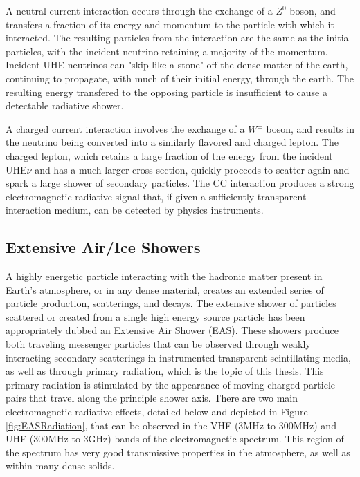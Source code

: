 		A neutral current interaction occurs through the exchange of a $Z^{0}$ boson, and transfers a fraction of its energy and momentum to the particle with which it interacted.  The resulting particles from the interaction are the same as the initial particles, with the incident neutrino retaining a majority of the momentum.  Incident UHE neutrinos can "skip like a stone" off the dense matter of the earth, continuing to propagate, with much of their initial energy, through the earth.  The resulting energy transfered to the opposing particle is insufficient to cause a detectable radiative shower.
		
		A charged current interaction involves the exchange of a $W^{\pm}$ boson, and results in the neutrino being converted into a similarly flavored and charged lepton.  The charged lepton, which retains a large fraction of the energy from the incident UHE$\nu$ and has a much larger cross section, quickly proceeds to scatter again and spark a large shower of secondary particles.  The CC interaction produces a strong electromagnetic radiative signal that, if given a sufficiently transparent interaction medium, can be detected by physics instruments.
			

	\subsection{Extensive Air/Ice Showers}
		A highly energetic particle interacting with the hadronic matter present in Earth's atmosphere, or in any  dense material, creates an extended series of particle production, scatterings, and decays.  The extensive shower of particles scattered or created from a single high energy source particle has been appropriately dubbed an Extensive Air Shower (EAS).  These showers produce both traveling messenger particles that can be observed through weakly interacting secondary scatterings in instrumented transparent scintillating media, as well as through primary radiation, which is the topic of this thesis.  This primary radiation is stimulated by the appearance of moving charged particle pairs that travel along the principle shower axis.  There are two main electromagnetic radiative effects, detailed below and depicted in Figure \ref{fig:EASRadiation}, that can be observed in the  VHF (3MHz to 300MHz) and UHF (300MHz to 3GHz) bands of the electromagnetic spectrum.  This region of the spectrum has very good transmissive properties in the atmosphere, as well as within many dense solids.\cite{Besson2009348}\cite{VuFind-000215473}\cite{Barrella:2010vs}
		


